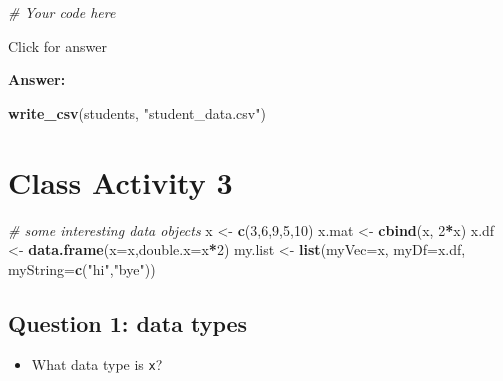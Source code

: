 \documentclass[
]{book}
\newenvironment{Shaded}{\begin{snugshade}}{\end{snugshade}}
\newcommand{\AttributeTok}[1]{\textcolor[rgb]{0.13,0.29,0.53}{#1}}
\newcommand{\CommentTok}[1]{\textcolor[rgb]{0.56,0.35,0.01}{\textit{#1}}}
\newcommand{\DecValTok}[1]{\textcolor[rgb]{0.00,0.00,0.81}{#1}}
\newcommand{\FunctionTok}[1]{\textcolor[rgb]{0.13,0.29,0.53}{\textbf{#1}}}
\newcommand{\NormalTok}[1]{#1}
\newcommand{\OtherTok}[1]{\textcolor[rgb]{0.56,0.35,0.01}{#1}}
\newcommand{\SpecialCharTok}[1]{\textcolor[rgb]{0.81,0.36,0.00}{\textbf{#1}}}
\newcommand{\StringTok}[1]{\textcolor[rgb]{0.31,0.60,0.02}{#1}}
\providecommand{\tightlist}{%
  \setlength{\itemsep}{0pt}\setlength{\parskip}{0pt}}
\begin{document}
\begin{Shaded}
\begin{Highlighting}[]
\CommentTok{\# Your code here}
\end{Highlighting}
\end{Shaded}

Click for answer

\textbf{Answer:}

\begin{Shaded}
\begin{Highlighting}[]
\FunctionTok{write\_csv}\NormalTok{(students, }\StringTok{"student\_data.csv"}\NormalTok{)}
\end{Highlighting}
\end{Shaded}

\hypertarget{class-activity-3}{%
\chapter{Class Activity 3}\label{class-activity-3}}

\begin{Shaded}
\begin{Highlighting}[]
\CommentTok{\# some interesting data objects}
\NormalTok{x }\OtherTok{\textless{}{-}} \FunctionTok{c}\NormalTok{(}\DecValTok{3}\NormalTok{,}\DecValTok{6}\NormalTok{,}\DecValTok{9}\NormalTok{,}\DecValTok{5}\NormalTok{,}\DecValTok{10}\NormalTok{)}
\NormalTok{x.mat }\OtherTok{\textless{}{-}} \FunctionTok{cbind}\NormalTok{(x, }\DecValTok{2}\SpecialCharTok{*}\NormalTok{x)}
\NormalTok{x.df }\OtherTok{\textless{}{-}} \FunctionTok{data.frame}\NormalTok{(}\AttributeTok{x=}\NormalTok{x,}\AttributeTok{double.x=}\NormalTok{x}\SpecialCharTok{*}\DecValTok{2}\NormalTok{)}
\NormalTok{my.list }\OtherTok{\textless{}{-}} \FunctionTok{list}\NormalTok{(}\AttributeTok{myVec=}\NormalTok{x, }\AttributeTok{myDf=}\NormalTok{x.df, }\AttributeTok{myString=}\FunctionTok{c}\NormalTok{(}\StringTok{"hi"}\NormalTok{,}\StringTok{"bye"}\NormalTok{))}
\end{Highlighting}
\end{Shaded}

\hypertarget{question-1-data-types}{%
\section{Question 1: data types}\label{question-1-data-types}}

\begin{itemize}
\tightlist
\item
  What data type is \texttt{x}?
\end{itemize}
\end{document}
